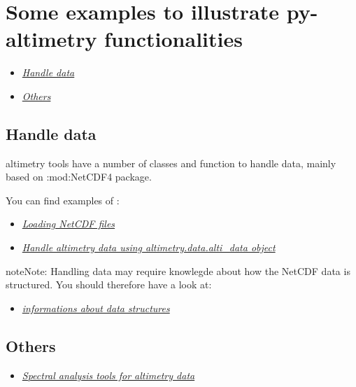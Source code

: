 \documentclass[letterpaper,10pt,english]{sphinxmanual}
\begin{document}
\section{Some examples to illustrate py-altimetry functionalities}
\label{Examples:some-examples-to-illustrate-py-altimetry-functionalities}\label{Examples::doc}\begin{itemize}\setlength{\itemsep}{0pt}\setlength{\parskip}{0pt}
\item {} 
{\hyperref[Examples:data]{\emph{Handle data}}}

\item {} 
{\hyperref[Examples:others]{\emph{Others}}}

\end{itemize}


\subsection{Handle data}
\label{Examples:handle-data}\label{Examples:data}
altimetry tools have a number of classes and function to handle data, mainly based on :mod:NetCDF4 package.

You can find examples of :
\begin{itemize}
\item {} 
{\hyperref[altimetry.tools.nctools:nc]{\emph{Loading NetCDF files}}}

\item {} 
{\hyperref[altimetry.data:alti-data]{\emph{Handle altimetry data using altimetry.data.alti\_data object}}}

\end{itemize}

\begin{notice}{note}{Note:}
Handling data may require knowlegde about how the NetCDF data is structured. You should therefore have a look at:
\begin{itemize}
\item {} 
{\hyperref[altimetry.data:structures]{\emph{informations about data structures}}}

\end{itemize}
\end{notice}


\subsection{Others}
\label{Examples:id1}\label{Examples:others}\begin{itemize}
\item {} 
{\hyperref[altimetry.tools.spectrum:spectral-tools]{\emph{Spectral analysis tools for altimetry data}}}

\end{itemize}
\end{document}
